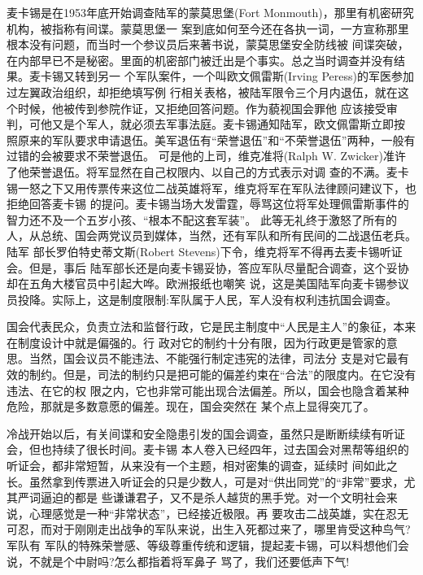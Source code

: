\documentclass[10pt]{article}
\begin{document}
{麦卡锡是在1953年底开始调查陆军的蒙莫思堡(Fort Monmouth)，那里有机密研究机构，被指称有间谍。蒙莫思堡一
案到底如何至今还在各执一词，一方宣称那里根本没有问题，而当时一个参议员后来著书说，蒙莫思堡安全防线被
间谍突破，在内部早已不是秘密。里面的机密部门被迁出是个事实。总之当时调查并没有结果。麦卡锡又转到另一
个军队案件，一个叫欧文\textperiodcentered 佩雷斯(Irving Peress)的军医参加过左翼政治组织，却拒绝填写例
行相关表格，被陆军限令三个月内退伍，就在这个时候，他被传到参院作证，又拒绝回答问题。作为藐视国会罪他
应该接受审判，可他又是个军人，就必须去军事法庭。麦卡锡通知陆军，欧文\textperiodcentered 佩雷斯立即按
照原来的军队要求申请退伍。美军退伍有``荣誉退伍''和``不荣誉退伍''两种，一般有过错的会被要求不荣誉退伍。
可是他的上司，维克准将(Ralph W. Zwicker)准许了他荣誉退伍。将军显然在自己权限内、以自己的方式表示对调
查的不满。麦卡锡一怒之下又用传票传来这位二战英雄将军，维克将军在军队法律顾问建议下，也拒绝回答麦卡锡
的提问。麦卡锡当场大发雷霆，辱骂这位将军处理佩雷斯事件的智力还不及一个五岁小孩、``根本不配这套军装''。
此等无礼终于激怒了所有的人，从总统、国会两党议员到媒体，当然，还有军队和所有民间的二战退伍老兵。陆军
部长罗伯特\textperiodcentered 史蒂文斯(Robert Stevens)下令，维克将军不得再去麦卡锡听证会。但是，事后
陆军部长还是向麦卡锡妥协，答应军队尽量配合调查，这个妥协却在五角大楼官员中引起大哗。欧洲报纸也嘲笑
说，这是美国陆军向麦卡锡参议员投降。实际上，这是制度限制:军队属于人民，军人没有权利违抗国会调查。

国会代表民众，负责立法和监督行政，它是民主制度中``人民是主人''的象征，本来在制度设计中就是偏强的。行
政对它的制约十分有限，因为行政更是管家的意思。当然，国会议员不能违法、不能强行制定违宪的法律，司法分
支是对它最有效的制约。但是，司法的制约只是把可能的偏差约束在``合法''的限度内。在它没有违法、在它的权
限之内，它也非常可能出现合法偏差。所以，国会也隐含着某种危险，那就是多数意愿的偏差。现在，国会突然在
某个点上显得突兀了。

冷战开始以后，有关间谍和安全隐患引发的国会调查，虽然只是断断续续有听证会，但也持续了很长时间。麦卡锡
本人卷入已经四年，过去国会对黑帮等组织的听证会，都非常短暂，从来没有一个主题，相对密集的调查，延续时
间如此之长。虽然拿到传票进入听证会的只是少数人，可是对``供出同党''的``非常''要求，尤其严词逼迫的都是
些谦谦君子，又不是杀人越货的黑手党。对一个文明社会来说，心理感觉是一种``非常状态''，已经接近极限。再
要攻击二战英雄，实在忍无可忍，而对于刚刚走出战争的军队来说，出生入死都过来了，哪里肯受这种鸟气?军队有
军队的特殊荣誉感、等级尊重传统和逻辑，提起麦卡锡，可以料想他们会说，不就是个中尉吗?怎么都指着将军鼻子
骂了，我们还要低声下气!

\pagebreak
}
\end{document}
